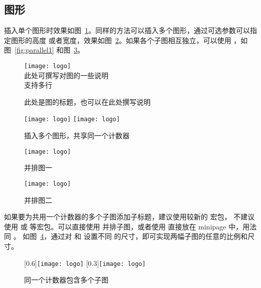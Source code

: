 \subsection{图形}

插入单个图形时效果如图~\ref{fig:single}。同样的方法可以插入多个图形，通过可选参数可以指定图形的高度
或者宽度，效果如图~\ref{fig:multi}。如果各个子图相互独立，可以使用 ，如图~\ref{fig:parallel1}
和图~\ref{fig:parallel2}。

\begin{figure}[!htbp]
  \centering
  \texttt{[image: logo]} \\
  此处可撰写对图的一些说明 \\
  支持多行
  \caption{此处是图的标题，也可以在此处撰写说明}\label{fig:single}
\end{figure}

\begin{figure}[!htbp]
  \centering
  \texttt{[image: logo]}
  \hspace{1cm}
  \texttt{[image: logo]}
  \caption{插入多个图形，共享同一个计数器}\label{fig:multi}
\end{figure}

\begin{figure}[!htbp]
  \begin{minipage}{0.45\textwidth}
    \centering
    \texttt{[image: logo]}
    \caption{并排图一}\label{fig:parallel1}
  \end{minipage}
  \hfill
  \begin{minipage}{0.45\textwidth}
    \centering
    \texttt{[image: logo]}
    \caption{并排图二}\label{fig:parallel2}
  \end{minipage}
\end{figure}

如果要为共用一个计数器的多个子图添加子标题，建议使用较新的  宏包，
不建议使用  或  等宏包。可以直接使用 
并排子图，或者使用  直接放在 minipage 中，用法同 。
如图~\ref{fig:subcapbox}，通过对  和  设置不同
的尺寸，即可实现两幅子图的任意的比例和尺寸。

\begin{figure}[!htbp]
  \centering
  [0.6\textwidth]{\texttt{[image: logo]}}
  [0.3\textwidth]{\texttt{[image: logo]}}
  \caption{同一个计数器包含多个子图}\label{fig:subcapbox}
\end{figure}

